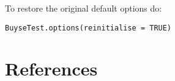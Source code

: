 \documentclass[12pt]{article}
\begin{document}
To restore the original default options do:
\lstset{language=r,label= ,caption= ,captionpos=b,numbers=none}
\begin{lstlisting}
BuyseTest.options(reinitialise = TRUE)
\end{lstlisting}

\clearpage


\section*{References}
\label{sec:org7f440ad}
\begingroup
\renewcommand{\section}[2]{}




\endgroup
\end{document}
